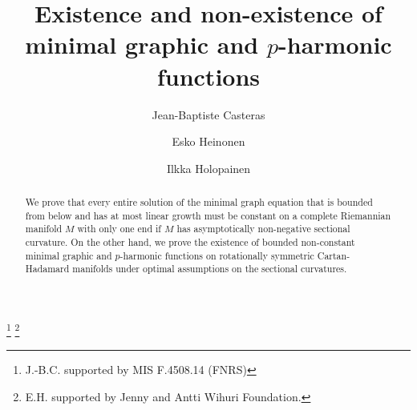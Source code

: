 \documentclass[10pt,a4paper,reqno]{amsart}
\numberwithin{equation}{section}
\theoremstyle{plain}
\theoremstyle{definition}
\begin{document}
\title[Minimal graphic and $p$-harmonic functions]{Existence and non-existence of minimal 
graphic and $p$-harmonic functions}



\author{Jean-Baptiste Casteras}
\address{J.-B. Casteras, Departement de Mathematique
Universite libre de Bruxelles, CP 214, Boulevard du Triomphe, B-1050 Bruxelles, Belgium}

\author{Esko Heinonen}
\address{E. Heinonen, Department of Mathematics and Statistics, P.O.B. 68 (Gustaf 
H\"allstr\"omin katu 2b), 00014 University
of Helsinki, Finland.}

\author{Ilkka Holopainen}
\address{I.Holopainen, Department of Mathematics and Statistics, P.O.B. 68 (Gustaf 
H\"allstr\"omin katu 2b), 00014 University
of Helsinki, Finland.}

\thanks{J.-B.C. supported by MIS F.4508.14 (FNRS)}
\thanks{E.H. supported by Jenny and Antti Wihuri Foundation.}





\begin{abstract}
We prove that every entire solution of the minimal graph equation that is bounded from below and has at most linear growth must be constant on a complete Riemannian manifold $M$ with only one end if $M$ has asymptotically non-negative sectional  curvature.  On the other hand, we prove the
existence of bounded non-constant minimal graphic and $p$-harmonic functions on rotationally symmetric
Cartan-Hadamard manifolds under optimal assumptions on the sectional curvatures.
\end{abstract}
\maketitle
\end{document}
